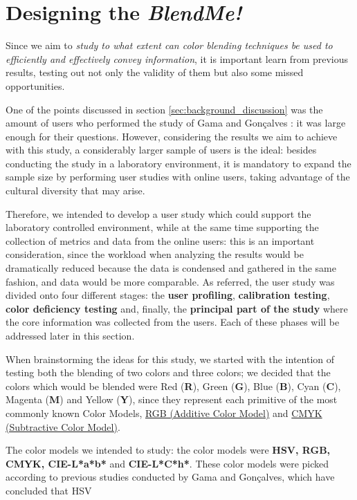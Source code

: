 \section{Designing the \emph{BlendMe!}}
\label{sec:impl_designingsolution}
%
Since we aim to \emph{study to what extent can color blending techniques be used to efficiently and effectively
convey information}, it is important learn from previous results, testing out not only the validity of them but also
some missed opportunities. \par
%
One of the points discussed in section \ref{sec:background_discussion} was the amount of users who performed the study
of Gama and Gonçalves \cite{Gama20141,Gama20142}: it was large enough for their questions. However, considering the
results we aim to achieve with this study, a considerably larger sample of users is the ideal: besides conducting
the study in a laboratory environment, it is mandatory to expand the sample size by performing user studies with
online users, taking advantage of the cultural diversity that may arise. \par
%
Therefore, we intended to develop a user study which could support the laboratory controlled environment, while at
the same time supporting the collection of metrics and data from the online users: this is an important consideration,
since the workload when analyzing the results would be dramatically reduced because the data is condensed and gathered
in the same fashion, and data would be more comparable. As referred, the user study was divided onto four different
stages: the \textbf{user profiling},
\textbf{calibration testing}, \textbf{color deficiency testing} and, finally, the \textbf{principal part of the study}
where the core information was collected from the users. Each of these phases will be addressed later in this section. \par
%
When brainstorming the ideas for this study, we started with the intention of testing both the blending of two colors and
three colors; we decided that the colors which would be blended were Red (\textbf{R}), Green (\textbf{G}),
Blue (\textbf{B}), Cyan (\textbf{C}), Magenta (\textbf{M}) and Yellow (\textbf{Y}), since they represent each primitive
of the most commonly known Color Models, \ul{RGB (Additive Color Model)} and \ul{CMYK (Subtractive Color Model)}. \par
%
The color models we intended to study: the color models were \textbf{HSV, RGB, CMYK, CIE-L*a*b*} and \textbf{CIE-L*C*h*}.
These color models were picked according to previous studies conducted by Gama and Gonçalves, which have concluded that HSV
